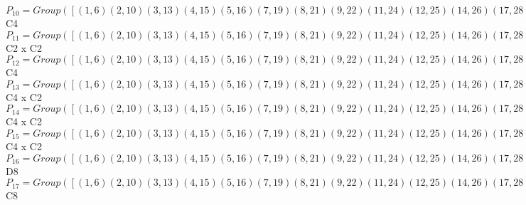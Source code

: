 \documentclass[varwidth=\maxdimen,border=10]{standalone}
\begin{document}
\begin{tabular}
$P_{10} = Group( [ ( 1, 6)( 2,10)( 3,13)( 4,15)( 5,16)( 7,19)( 8,21)( 9,22)(11,24)(12,25)(14,26)(17,28)(18,29)(20,30)(23,31)(27,32), ( 1,24, 6,11)( 2,28,10,17)( 3,15,13, 4)( 5,31,16,23)( 7,21,19, 8)( 9,32,22,27)(12,26,25,14)(18,30,29,20) ] )\cong$ C4\ \\
$P_{11} = Group( [ ( 1, 6)( 2,10)( 3,13)( 4,15)( 5,16)( 7,19)( 8,21)( 9,22)(11,24)(12,25)(14,26)(17,28)(18,29)(20,30)(23,31)(27,32), ( 1,31)( 2,32)( 3,26)( 4,12)( 5,11)( 6,23)( 7,30)( 8,18)( 9,17)(10,27)(13,14)(15,25)(16,24)(19,20)(21,29)(22,28) ] )\cong$ C2 x C2\ \\
$P_{12} = Group( [ ( 1, 6)( 2,10)( 3,13)( 4,15)( 5,16)( 7,19)( 8,21)( 9,22)(11,24)(12,25)(14,26)(17,28)(18,29)(20,30)(23,31)(27,32), ( 1, 5, 6,16)( 2, 9,10,22)( 3,12,13,25)( 4,14,15,26)( 7,18,19,29)( 8,20,21,30)(11,23,24,31)(17,27,28,32) ] )\cong$ C4\ \\
$P_{13} = Group( [ ( 1, 6)( 2,10)( 3,13)( 4,15)( 5,16)( 7,19)( 8,21)( 9,22)(11,24)(12,25)(14,26)(17,28)(18,29)(20,30)(23,31)(27,32), ( 1, 5, 6,16)( 2, 9,10,22)( 3,12,13,25)( 4,14,15,26)( 7,18,19,29)( 8,20,21,30)(11,23,24,31)(17,27,28,32), ( 1, 3)( 2, 7)( 4,24)( 5,12)( 6,13)( 8,28)( 9,18)(10,19)(11,15)(14,31)(16,25)(17,21)(20,32)(22,29)(23,26)(27,30) ] )\cong$ C4 x C2\ \\
$P_{14} = Group( [ ( 1, 6)( 2,10)( 3,13)( 4,15)( 5,16)( 7,19)( 8,21)( 9,22)(11,24)(12,25)(14,26)(17,28)(18,29)(20,30)(23,31)(27,32), ( 1, 5, 6,16)( 2, 9,10,22)( 3,12,13,25)( 4,14,15,26)( 7,18,19,29)( 8,20,21,30)(11,23,24,31)(17,27,28,32), ( 1, 4)( 2, 8)( 3,11)( 5,14)( 6,15)( 7,17)( 9,20)(10,21)(12,23)(13,24)(16,26)(18,27)(19,28)(22,30)(25,31)(29,32) ] )\cong$ C4 x C2\ \\
$P_{15} = Group( [ ( 1, 6)( 2,10)( 3,13)( 4,15)( 5,16)( 7,19)( 8,21)( 9,22)(11,24)(12,25)(14,26)(17,28)(18,29)(20,30)(23,31)(27,32), ( 1, 5, 6,16)( 2, 9,10,22)( 3,12,13,25)( 4,14,15,26)( 7,18,19,29)( 8,20,21,30)(11,23,24,31)(17,27,28,32), ( 1,24, 6,11)( 2,28,10,17)( 3,15,13, 4)( 5,31,16,23)( 7,21,19, 8)( 9,32,22,27)(12,26,25,14)(18,30,29,20) ] )\cong$ C4 x C2\ \\
$P_{16} = Group( [ ( 1, 6)( 2,10)( 3,13)( 4,15)( 5,16)( 7,19)( 8,21)( 9,22)(11,24)(12,25)(14,26)(17,28)(18,29)(20,30)(23,31)(27,32), ( 1, 4)( 2, 8)( 3,11)( 5,14)( 6,15)( 7,17)( 9,20)(10,21)(12,23)(13,24)(16,26)(18,27)(19,28)(22,30)(25,31)(29,32), ( 1, 3)( 2, 7)( 4,24)( 5,12)( 6,13)( 8,28)( 9,18)(10,19)(11,15)(14,31)(16,25)(17,21)(20,32)(22,29)(23,26)(27,30) ] )\cong$ D8\ \\
$P_{17} = Group( [ ( 1, 6)( 2,10)( 3,13)( 4,15)( 5,16)( 7,19)( 8,21)( 9,22)(11,24)(12,25)(14,26)(17,28)(18,29)(20,30)(23,31)(27,32), ( 1, 5, 6,16)( 2, 9,10,22)( 3,12,13,25)( 4,14,15,26)( 7,18,19,29)( 8,20,21,30)(11,23,24,31)(17,27,28,32), ( 1, 8, 5,20, 6,21,16,30)( 2,14, 9,15,10,26,22, 4)( 3,17,12,27,13,28,25,32)( 7,23,18,24,19,31,29,11) ] )\cong$ C8\ \\

\end{tabular}
\end{document}
